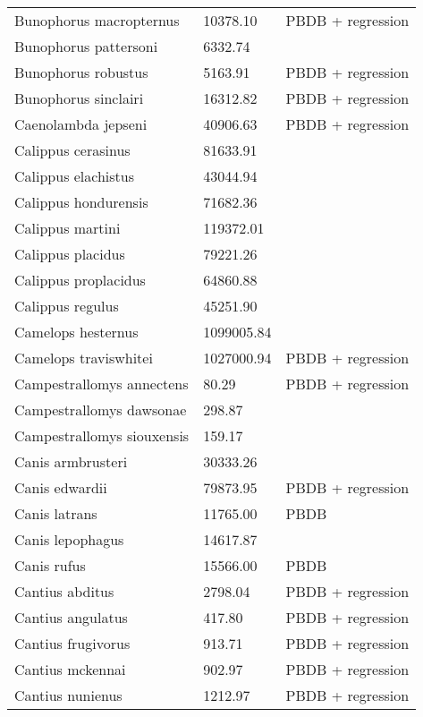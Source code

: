\documentclass{article}
\begin{document}
\begin{center}
\begin{longtable}{p{} p{} p{}}
    Bunophorus macropternus & 10378.10 & PBDB + regression \\ 
    Bunophorus pattersoni & 6332.74 & \cite{Macdonald1956} \\ 
    Bunophorus robustus & 5163.91 & PBDB + regression \\ 
    Bunophorus sinclairi & 16312.82 & PBDB + regression \\ 
    Caenolambda jepseni & 40906.63 & PBDB + regression \\ 
    Calippus cerasinus & 81633.91 & \cite{Tomiya2013} \\ 
    Calippus elachistus & 43044.94 & \cite{Tomiya2013} \\ 
    Calippus hondurensis & 71682.36 & \cite{Tomiya2013} \\ 
    Calippus martini & 119372.01 & \cite{Tomiya2013} \\ 
    Calippus placidus & 79221.26 & \cite{Tomiya2013} \\ 
    Calippus proplacidus & 64860.88 & \cite{Tomiya2013} \\ 
    Calippus regulus & 45251.90 & \cite{Tomiya2013} \\ 
    Camelops hesternus & 1099005.84 & \cite{Smith2004} \\ 
    Camelops traviswhitei & 1027000.94 & PBDB + regression \\ 
    Campestrallomys annectens & 80.29 & PBDB + regression \\ 
    Campestrallomys dawsonae & 298.87 & \cite{Tomiya2013} \\ 
    Campestrallomys siouxensis & 159.17 & \cite{Tomiya2013} \\ 
    Canis armbrusteri & 30333.26 & \cite{Tomiya2013} \\ 
    Canis edwardii & 79873.95 & PBDB + regression \\ 
    Canis latrans & 11765.00 & PBDB \\ 
    Canis lepophagus & 14617.87 & \cite{Tomiya2013} \\ 
    Canis rufus & 15566.00 & PBDB \\ 
    Cantius abditus & 2798.04 & PBDB + regression \\ 
    Cantius angulatus & 417.80 & PBDB + regression \\ 
    Cantius frugivorus & 913.71 & PBDB + regression \\ 
    Cantius mckennai & 902.97 & PBDB + regression \\ 
    Cantius nunienus & 1212.97 & PBDB + regression \\ 

\end{longtable}
\end{center}
\end{document}
